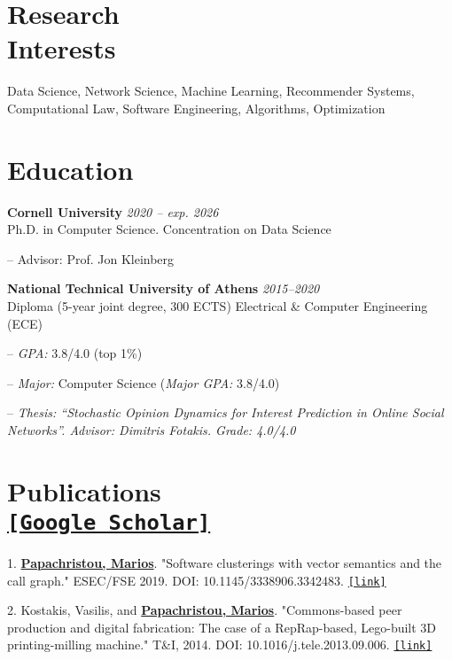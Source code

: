\documentclass[margin, 10pt]{res}
\newcommand{\field}[2]{\noindent \textbf{#1} \hfill #2 \\}
\begin{document}
\begin{resume}

\section{Research \\ Interests} Data Science, Network Science, Machine Learning, Recommender Systems, Computational Law, Software Engineering, Algorithms, Optimization 

\section{Education}
\field {Cornell University} {\emph{2020 -- exp. 2026}}
Ph.D. in Computer Science. Concentration on Data Science
\begin{compactitem}
\item[--] Advisor: Prof. Jon Kleinberg
\end{compactitem} 
 
\field{National Technical University of Athens}  {\emph{2015--2020}} 
Diploma (5-year joint degree, 300 ECTS) Electrical \& Computer Engineering (ECE)
\begin{compactitem}
\item[--] \emph{GPA:} 3.8/4.0 (top 1\%)
\item[--] \emph{Major:} Computer Science (\emph{Major GPA:} 3.8/4.0)
\item[--] \emph{Thesis: ``Stochastic Opinion Dynamics for Interest Prediction in Online Social Networks''. Advisor: Dimitris Fotakis. Grade: 4.0/4.0}
\end{compactitem} 


\section{Publications \\ \href{https://scholar.google.gr/citations?user=T12JO3MAAAAJ&hl=en}{\nolinkurl{[Google Scholar]}}}

\begin{compactitem}
    \item[1.] \underline{\textbf{Papachristou, Marios}}. "Software clusterings with vector semantics and the call graph." ESEC/FSE 2019. DOI: 10.1145/3338906.3342483. \href{https://dl.acm.org/citation.cfm?id=3342483}{\nolinkurl{[link]}}
    \item[2.] Kostakis, Vasilis, and \underline{\textbf{Papachristou, Marios}}. "Commons-based peer production and digital fabrication: The case of a RepRap-based, Lego-built 3D printing-milling machine." T\&I, 2014. DOI: 10.1016/j.tele.2013.09.006. \href{https://bit.ly/2JRoisV}{\nolinkurl{[link]}} \end{compactitem}



\end{resume}
\end{document}
